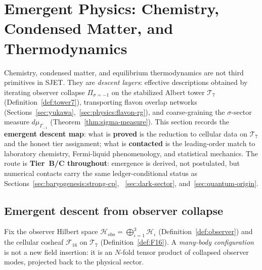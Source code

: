 \section{Emergent Physics: Chemistry, Condensed Matter, and Thermodynamics}
\label{sec:emergent}

Chemistry, condensed matter, and equilibrium thermodynamics are not third
primitives in SJET. They are \emph{descent layers}: effective descriptions
obtained by iterating observer collapse $\Pi_{\sigma=-1}$ on the stabilized
Albert tower $\mathcal{T}_7$ (Definition~\ref{def:tower7}), transporting
flavon overlap networks (Sections~\ref{sec:yukawa},~\ref{sec:physics:flavon-rg}),
and coarse-graining the $\sigma$-sector measure $d\mu_{\Gamma_{-1}}$
(Theorem~\ref{thm:sigma-measure}). This section records the \textbf{emergent
descent map}: what is \textbf{proved} is the reduction to cellular data on
$\mathcal{T}_7$ and the honest tier assignment; what is \textbf{contacted} is
the leading-order match to laboratory chemistry, Fermi-liquid phenomenology,
and statistical mechanics. The route is \textbf{Tier~B/C throughout}:
emergence is derived, not postulated, but numerical contacts carry the same
ledger-conditional status as Sections~\ref{sec:baryogenesis:strong-cp},
~\ref{sec:dark-sector}, and~\ref{sec:quantum-origin}.

\subsection{Emergent descent from observer collapse}
\label{sec:emergent:descent}

Fix the observer Hilbert space
$\mathcal{H}_{\mathrm{obs}}=\bigoplus_{\iota=1}^3\mathcal{H}_\iota$
(Definition~\ref{def:observer}) and the cellular cosheaf
$\mathcal{F}_{16}$ on $\mathcal{T}_7$ (Definition~\ref{def:F16}). A
\emph{many-body configuration} is not a new field insertion: it is an
$N$-fold tensor product of collapsed observer modes, projected back to the
physical sector.

